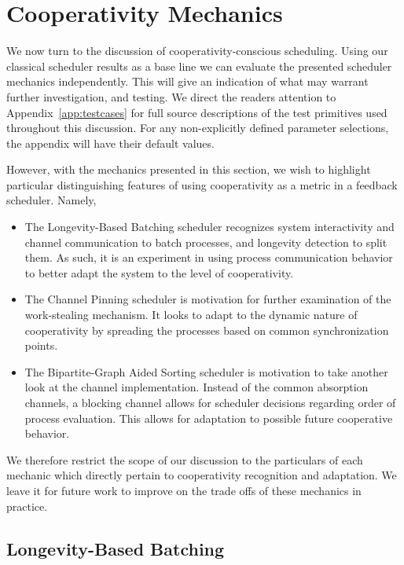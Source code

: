 \section{Cooperativity Mechanics}\label{sec:results-evaluation-feedback}

We now turn to the discussion of cooperativity-conscious scheduling.
Using our classical scheduler results as a base line we can evaluate 
the presented scheduler mechanics independently. This will give an indication of what
may warrant further investigation, and testing. We direct the readers attention
to Appendix~\ref{app:testcases} for full source descriptions of the test 
primitives used throughout this discussion. For any non-explicitly defined
parameter selections, the appendix will have their default values.

However, with the mechanics presented in this section, we wish to highlight particular
distinguishing features of using cooperativity as a metric in a feedback scheduler. 
Namely,
\begin{itemize}
    \item The Longevity-Based Batching scheduler recognizes system interactivity
        and channel communication to batch processes, and longevity detection to
        split them. As such, it is an experiment in using process communication
        behavior to better adapt the system to the level of cooperativity.

    \item The Channel Pinning scheduler is motivation for further examination of
        the work-stealing mechanism. It looks to adapt to the dynamic nature of
        cooperativity by spreading the processes based on common synchronization 
        points.

    \item The Bipartite-Graph Aided Sorting scheduler is motivation to take 
        another look at the channel implementation. Instead of the common 
        absorption channels, a blocking channel allows for scheduler decisions 
        regarding order of process evaluation. This allows for adaptation 
        to possible future cooperative behavior.
\end{itemize}
We therefore restrict the scope of our discussion to the particulars of
each mechanic which directly pertain to cooperativity recognition and
adaptation. We leave it for future work to improve on the trade offs of these
mechanics in practice.

\subsection{Longevity-Based Batching}\label{sec:results-longbatcher}

